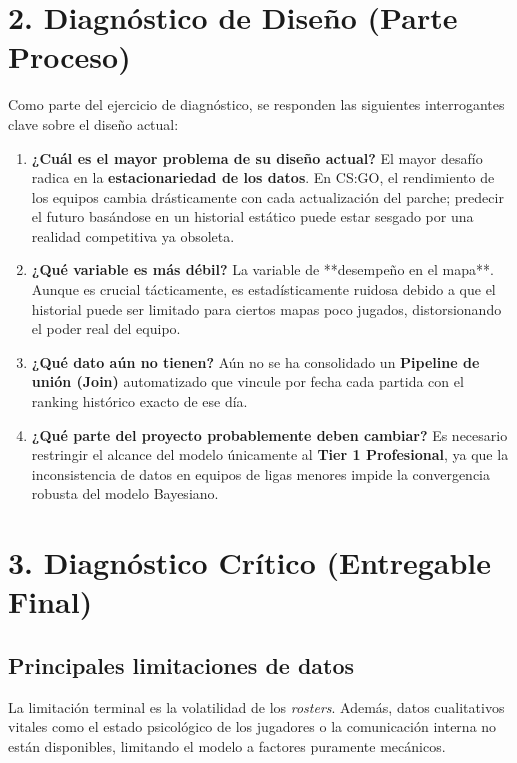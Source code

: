\documentclass[12pt,a4paper]{article}
\begin{document}
\section{2. Diagnóstico de Diseño (Parte Proceso)}

Como parte del ejercicio de diagnóstico, se responden las siguientes interrogantes clave sobre el diseño actual:

\begin{enumerate}
    \item \textbf{¿Cuál es el mayor problema de su diseño actual?}
    El mayor desafío radica en la \textbf{estacionariedad de los datos}. En CS:GO, el rendimiento de los equipos cambia drásticamente con cada actualización del parche; predecir el futuro basándose en un historial estático puede estar sesgado por una realidad competitiva ya obsoleta.
    
    \item \textbf{¿Qué variable es más débil?}
    La variable de **desempeño en el mapa**. Aunque es crucial tácticamente, es estadísticamente ruidosa debido a que el historial puede ser limitado para ciertos mapas poco jugados, distorsionando el poder real del equipo.
    
    \item \textbf{¿Qué dato aún no tienen?}
    Aún no se ha consolidado un \textbf{Pipeline de unión (Join)} automatizado que vincule por fecha cada partida con el ranking histórico exacto de ese día.
    
    \item \textbf{¿Qué parte del proyecto probablemente deben cambiar?}
    Es necesario restringir el alcance del modelo únicamente al \textbf{Tier 1 Profesional}, ya que la inconsistencia de datos en equipos de ligas menores impide la convergencia robusta del modelo Bayesiano.
\end{enumerate}

\section{3. Diagnóstico Crítico (Entregable Final)}

\subsection{Principales limitaciones de datos}
La limitación terminal es la volatilidad de los \textit{rosters}. Además, datos cualitativos vitales como el estado psicológico de los jugadores o la comunicación interna no están disponibles, limitando el modelo a factores puramente mecánicos.
\end{document}
